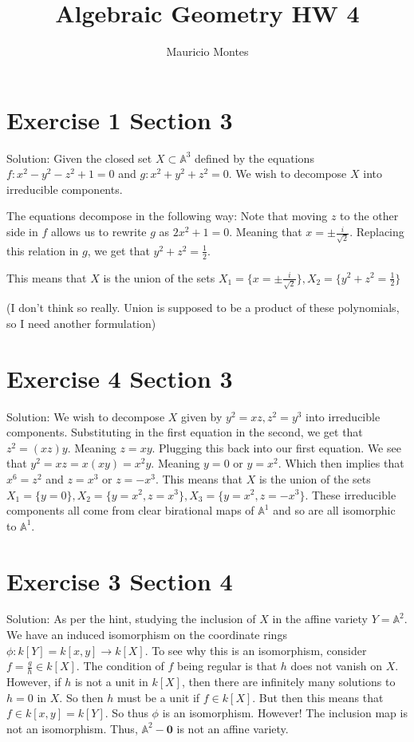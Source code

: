 \documentclass{article}
\title{Algebraic Geometry HW 4}
\author{Mauricio Montes}
\begin{document}
\maketitle

\section*{Exercise 1 Section 3 }

Solution: Given the closed set $X \subset \mathbb{A}^3$ defined by the equations
$f: x^2 - y^2 - z^2 + 1= 0$ and $g: x^2 + y^2 + z^2 = 0$. We wish to decompose $X$ into irreducible components.

The equations decompose in the following way: Note that moving $z$ to the other side in $f$ allows us to rewrite $g$ as
$2x^2 + 1 = 0$. Meaning that $x = \pm \frac{i}{\sqrt{2}}$. Replacing this relation in $g$, we get that $y^2 + z^2 = \frac{1}{2}$.

This means that $X$ is the union of the sets $X_1 = \{x = \pm \frac{i}{\sqrt{2}} \}, X_2 = \{y^2 + z^2 = \frac{1}{2}\}$

(I don't think so really. Union is supposed to be a product of these polynomials, so I need another formulation)

\section*{Exercise 4 Section 3}


Solution: We wish to decompose $X$ given by $y^2 = xz, z^2 = y^3$ into irreducible components. Substituting in 
the first equation in the second, we get that $z^2 = (xz)y$. Meaning $z = xy$. Plugging this back into our first
equation. We see that $y^2 = xz = x(xy) = x^2y$. Meaning $y = 0$ or $y = x^2$. Which then implies that $x^6 = z^2$ and 
$z = x^3$ or $z = -x^3$. This means that $X$ is the union of the sets 
$X_1 = \{y = 0\}, X_2 = \{y = x^2, z = x^3\}, X_3 = \{y = x^2, z = -x^3\}$. These irreducible components all come from clear
birational maps of $\mathbb{A}^1$ and so are all isomorphic to $\mathbb{A}^1$.

\section*{Exercise 3 Section 4}

Solution: As per the hint, studying the inclusion of $X$ in the affine variety $Y = \mathbb{A}^2$.
We have an induced isomorphism on the coordinate rings $\phi: k[Y]= k[x,y] \rightarrow k[X]$. To see why this is an isomorphism,
consider $f = \frac{g}{h} \in k[X]$. The condition of $f$ being regular is that $h$ does not vanish on $X$. However, if $h$ is not
a unit in $k[X]$, then there are infinitely many solutions to $h = 0$ in $X$. So then $h$ must be a unit if $f \in k[X]$.
But then this means that $f \in k[x,y] = k[Y]$. So thus $\phi$ is an isomorphism. However! The inclusion map is not an isomorphism.
Thus, $\mathbb{A}^2 - \mathbf{0}$ is not an affine variety.
\end{document}
